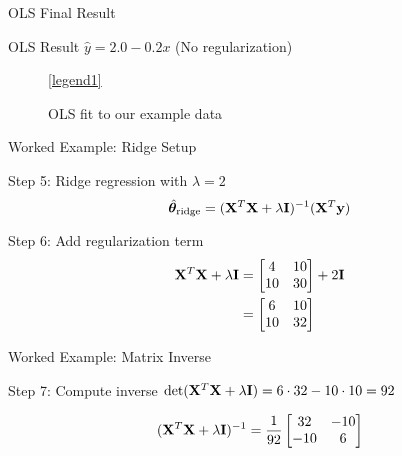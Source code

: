 \documentclass{beamer}
\begin{document}
\begin{frame}{OLS Final Result}
\begin{theorembox}{OLS Result}
$\hat{y} = 2.0 - 0.2x$ \quad (No regularization)
\end{theorembox}

\begin{figure}
\centering
{}
\vspace{-0.2cm}
\ref{legend1}
\caption{{\small OLS fit to our example data}}
\end{figure}
\end{frame}

\begin{frame}{Worked Example: Ridge Setup}
\begin{codebox}{Step 5: Ridge regression with $\lambda = 2$}
$$\hat{\boldsymbol{\theta}}_{\text{ridge}} = (\mathbf{X}^{T}\mathbf{X} + \lambda\mathbf{I})^{-1}(\mathbf{X}^{T}\mathbf{y})$$
\end{codebox}
\pause

\begin{codebox}{Step 6: Add regularization term}
\begin{align*}
\mathbf{X}^{T}\mathbf{X} + \lambda\mathbf{I} &= \begin{bmatrix} 4 & 10 \\ 10 & 30 \end{bmatrix} + 2\mathbf{I} \\
&= \begin{bmatrix} 6 & 10 \\ 10 & 32 \end{bmatrix}
\end{align*}
\end{codebox}
\end{frame}

\begin{frame}{Worked Example: Matrix Inverse}
\begin{codebox}{Step 7: Compute inverse}
$\operatorname{det}(\mathbf{X}^T\mathbf{X} + \lambda\mathbf{I}) = 6 \cdot 32 - 10 \cdot 10 = 92$

$$(\mathbf{X}^{T}\mathbf{X} + \lambda\mathbf{I})^{-1} = \frac{1}{92} \begin{bmatrix} 32 & -10 \\ -10 & 6 \end{bmatrix}$$
\end{codebox}
\end{frame}
\end{document}
